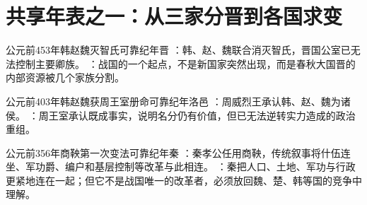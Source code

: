 \section{共享年表之一：从三家分晋到各国求变}

\begin{event}{公元前453年}{韩赵魏灭智氏}{可靠纪年}{晋}
：韩、赵、魏联合消灭智氏，晋国公室已无法控制主要卿族。
：战国的一个起点，不是新国家突然出现，而是春秋大国晋的内部资源被几个家族分割。
\end{event}

\begin{event}{公元前403年}{韩赵魏获周王室册命}{可靠纪年}{洛邑}
：周威烈王承认韩、赵、魏为诸侯。
：周王室承认既成事实，说明名分仍有价值，但已无法逆转实力造成的政治重组。
\end{event}

\begin{event}{公元前356年}{商鞅第一次变法}{可靠纪年}{秦}
：秦孝公任用商鞅，传统叙事将什伍连坐、军功爵、编户和基层控制等改革与此相连。
：秦把人口、土地、军功与行政更紧地连在一起；但它不是战国唯一的改革者，必须放回魏、楚、韩等国的竞争中理解。
\end{event}
